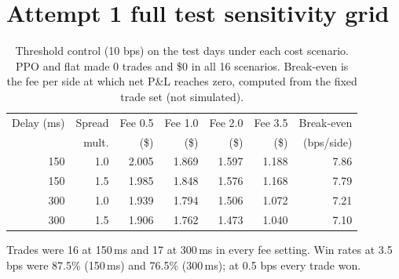 \documentclass[12pt,a4paper]{article}
\DeclareRobustCommand{\bps}{\ifmmode\,\text{bps}\else\,bps\fi}
\begin{document}
\section{Attempt 1 full test sensitivity grid}\label{app:sens}
\begin{table}[H]
\centering
\caption{Threshold control (10\bps) on the test days under each cost scenario. PPO and flat
made 0 trades and \$0 in all 16 scenarios. Break-even is the fee per side at which net P\&L
reaches zero, computed from the fixed trade set (not simulated).}
\label{tab:sensgrid}
\begin{tabular}{@{}rrrrrrr@{}}
\toprule
Delay (ms) & Spread & Fee 0.5 & Fee 1.0 & Fee 2.0 & Fee 3.5 & Break-even \\
 & mult. & (\$) & (\$) & (\$) & (\$) & (bps/side) \\
\midrule
150 & 1.0 & 2.005 & 1.869 & 1.597 & 1.188 & 7.86 \\
150 & 1.5 & 1.985 & 1.848 & 1.576 & 1.168 & 7.79 \\
300 & 1.0 & 1.939 & 1.794 & 1.506 & 1.072 & 7.21 \\
300 & 1.5 & 1.906 & 1.762 & 1.473 & 1.040 & 7.10 \\
\bottomrule
\end{tabular}
\end{table}
Trades were 16 at 150\,ms and 17 at 300\,ms in every fee setting. Win rates at 3.5\bps{} were
87.5\% (150\,ms) and 76.5\% (300\,ms); at 0.5\bps{} every trade won.
\end{document}
